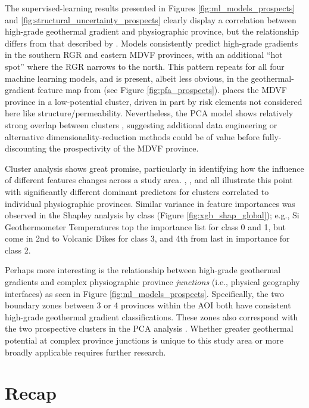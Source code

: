 The supervised-learning results presented in Figures \ref{fig:ml_models_prospects} and \ref{fig:structural_uncertainty_prospects} clearly display a correlation between high-grade geothermal gradient and physiographic province, but the relationship differs from that described by \citet{pepin_new_2019}. Models consistently predict high-grade gradients in the southern RGR and eastern MDVF provinces, with an additional ``hot spot'' where the RGR narrows to the north. This pattern repeats for all four machine learning models, and is present, albeit less obvious, in the geothermal-gradient feature map from \citet{bielicki_hydrogeolgic_2015} (see Figure \ref{fig:pfa_prospects}). \citet{pepin_new_2019} places the MDVF province in a low-potential cluster, driven in part by risk elements not considered here like structure/permeability. Nevertheless, the PCA model shows relatively strong overlap between clusters \citep[][Figure 3.4]{pepin_new_2019}, suggesting additional data engineering or alternative dimensionality-reduction methods could be of value before fully-discounting the prospectivity of the MDVF province.

Cluster analysis shows great promise, particularly in identifying how the influence of different features changes across a study area. \citet{pepin_new_2019}, \citet{smith_characterizing_2021}, and \citet{vesselinov_discovering_2020} all illustrate this point with significantly different dominant predictors for clusters correlated to individual physiographic provinces. Similar variance in feature importances was observed in the Shapley analysis by class (Figure \ref{fig:xgb_shap_global}); e.g., Si Geothermometer Temperatures top the importance list for class 0 and 1, but come in 2nd to Volcanic Dikes for class 3, and 4th from last in importance for class 2.

Perhaps more interesting is the relationship between high-grade geothermal gradients and complex physiographic province \textit{junctions} (i.e., physical geography interfaces) as seen in Figure \ref{fig:ml_models_prospects}. Specifically, the two boundary zones between 3 or 4 provinces within the AOI both have consistent high-grade geothermal gradient classifications. These zones also correspond with the two prospective clusters in the PCA analysis \citep{pepin_new_2019}. Whether greater geothermal potential at complex province junctions is unique to this study area or more broadly applicable requires further research.

\section{Recap}\label{ch5:recap}

